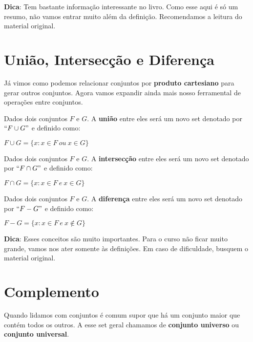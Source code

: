 \documentclass[main.tex]{subfiles}
\begin{document}
\textbf{Dica}: Tem bastante informação interessante no livro. Como esse aqui é só um resumo, não vamos entrar muito além da definição. Recomendamos a leitura do material original.

\section{União, Intersecção e Diferença}

Já vimos como podemos relacionar conjuntos por \textbf{produto cartesiano} para gerar outros conjuntos. Agora vamos expandir ainda mais nosso ferramental de operações entre conjuntos.

\begin{definition}[União]
Dados dois conjuntos $F$ e $G$. A \textbf{união} entre eles será um novo set denotado por $``F \cup G"$ e definido como:
\begin{center}
	$F \cup G = \{ x : x \in F \ ou \ x \in G \}$
\end{center}
\end{definition}

\begin{definition}[Intersecção]
Dados dois conjuntos $F$ e $G$. A \textbf{intersecção} entre eles será um novo set denotado por $``F \cap G"$ e definido como:
\begin{center}
	$F \cap G = \{ x : x \in F \ e \ x \in G \}$
\end{center}
\end{definition}

\begin{definition}[Diferença]
Dados dois conjuntos $F$ e $G$. A \textbf{diferença} entre eles será um novo set denotado por $``F - G"$ e definido como:
\begin{center}
	$F - G = \{ x : x \in F \ e \ x \notin G \}$
\end{center}
\end{definition}

\textbf{Dica}: Esses conceitos são muito importantes. Para o curso não ficar muito grande, vamos nos ater somente às definições. Em caso de dificuldade, busquem o material original.

\section{Complemento}

Quando lidamos com conjuntos é comum supor que há um conjunto maior que contém todos os outros. A esse set geral chamamos de \textbf{conjunto universo} ou \textbf{conjunto universal}.
\end{document}
